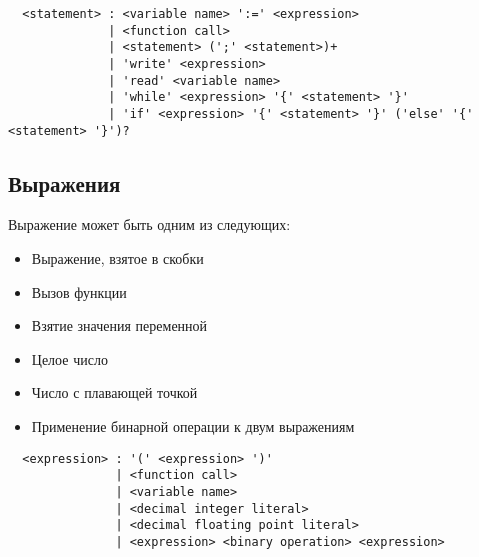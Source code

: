 \documentclass{amsart}
\begin{document}
  \begin{lstlisting}
  <statement> : <variable name> ':=' <expression> 
              | <function call>
              | <statement> (';' <statement>)+
              | 'write' <expression>
              | 'read' <variable name>
              | 'while' <expression> '{' <statement> '}'
              | 'if' <expression> '{' <statement> '}' ('else' '{' <statement> '}')?
  \end{lstlisting}

  \subsection{Выражения}
  Выражение может быть одним из следующих:

  \begin{itemize}
      \item Выражение, взятое в скобки
      \item Вызов функции
      \item Взятие значения переменной
      \item Целое число
      \item Число с плавающей точкой
      \item Применение бинарной операции к двум выражениям
  \end{itemize}

  \begin{lstlisting}
  <expression> : '(' <expression> ')'
               | <function call>
               | <variable name> 
               | <decimal integer literal>
               | <decimal floating point literal>
               | <expression> <binary operation> <expression>
  \end{lstlisting}
\end{document}
